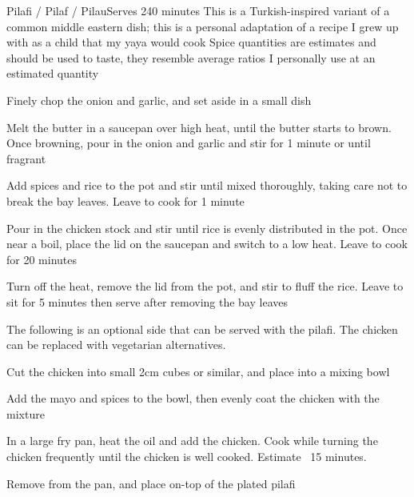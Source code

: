 \begin{recipe}{Pilafi / Pilaf / Pilau}{Serves 2}{40 minutes}
\freeform This is a Turkish-inspired variant of a common middle eastern dish; this is a personal adaptation of a recipe I grew up with as a child that my yaya would cook
\freeform Spice quantities are estimates and should be used to taste, they resemble average ratios I personally use at an estimated quantity

Finely chop the onion and garlic, and set aside in a small dish

Melt the butter in a saucepan over high heat, until the butter starts to brown. Once browning, pour in the onion and garlic and stir for 1 minute or until fragrant

Add spices and rice to the pot and stir until mixed thoroughly, taking care not to break the bay leaves. Leave to cook for 1 minute

Pour in the chicken stock and stir until rice is evenly distributed in the pot. Once near a boil, place the lid on the saucepan and switch to a low heat. Leave to cook for 20 minutes

\newstep
Turn off the heat, remove the lid from the pot, and stir to fluff the rice. Leave to sit for 5 minutes then serve after removing the bay leaves



\freeform The following is an optional side that can be served with the pilafi. The chicken can be replaced with vegetarian alternatives.

Cut the chicken into small 2cm cubes or similar, and place into a mixing bowl

Add the mayo and spices to the bowl, then evenly coat the chicken with the mixture

In a large fry pan, heat the oil and add the chicken. Cook while turning the chicken frequently until the chicken is well cooked. Estimate ~15 minutes.

\newstep
Remove from the pan, and place on-top of the plated pilafi

\end{recipe}
